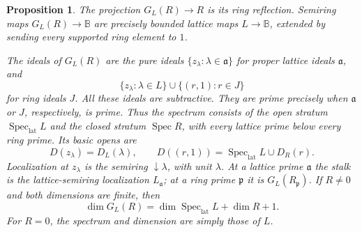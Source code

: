 \documentclass[11pt]{amsart}
\newcommand{\B}{\mathbb B}
\DeclareMathOperator{\Spec}{Spec}
\newtheorem{proposition}[theorem]{Proposition}
\theoremstyle{definition}
\theoremstyle{remark}
\begin{document}
\begin{proposition}\label{prop:latticeextension}
The projection $G_L(R)\to R$ is its ring reflection. Semiring maps $G_L(R)\to\B$ are precisely bounded lattice maps $L\to\B$, extended by sending every supported ring element to $1$.

The ideals of $G_L(R)$ are the pure ideals $\{z_\lambda:\lambda\in\mathfrak a\}$ for proper lattice ideals $\mathfrak a$, and
\[
 \{z_\lambda:\lambda\in L\}\cup\{(r,1):r\in J\}
\]
for ring ideals $J$. All these ideals are subtractive. They are prime precisely when $\mathfrak a$ or $J$, respectively, is prime. Thus the spectrum consists of the open stratum $\Spec_{\mathrm{lat}}L$ and the closed stratum $\Spec R$, with every lattice prime below every ring prime. Its basic opens are
\[
 D(z_\lambda)=D_L(\lambda),\qquad
 D((r,1))=\Spec_{\mathrm{lat}}L\cup D_R(r).
\]
Localization at $z_\lambda$ is the semiring $\downarrow\lambda$, with unit $\lambda$. At a lattice prime $\mathfrak a$ the stalk is the lattice-semiring localization $L_{\mathfrak a}$; at a ring prime $\mathfrak p$ it is $G_L(R_{\mathfrak p})$. If $R\ne0$ and both dimensions are finite, then
\[
 \dim G_L(R)=\dim\Spec_{\mathrm{lat}}L+\dim R+1.
\]
For $R=0$, the spectrum and dimension are simply those of $L$.
\end{proposition}
\end{document}
